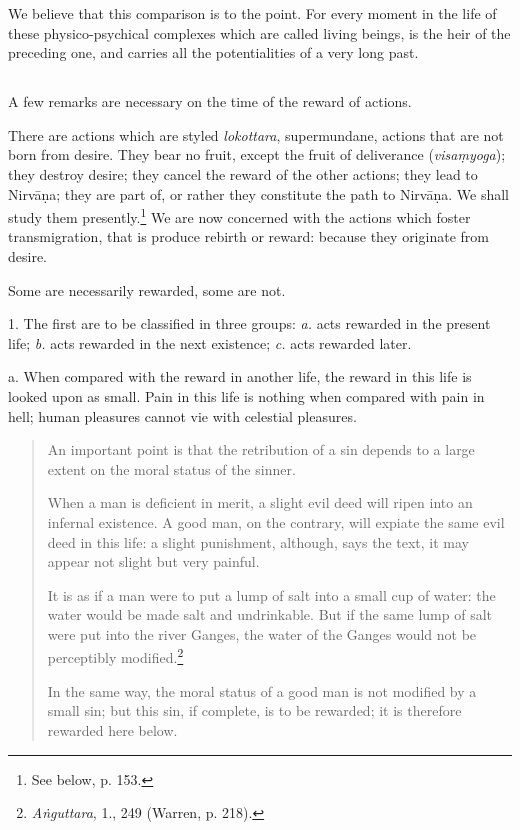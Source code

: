 \documentclass[a4paper, 11pt, oneside, english]{article}
\begin{document}
We believe that this comparison is to the point. For every moment in the life of these physico-psychical complexes which are called living beings, is the heir of the preceding one, and carries all the potentialities of a very long past.

\subsection{}
\paragraph{}
A few remarks are necessary on the time of the reward of actions.

There are actions which are styled \emph{lokottara}, supermundane, actions that are not born from desire. They bear no fruit, except the fruit of deliverance (\emph{visaṃyoga}); they destroy desire; they cancel the reward of the other actions; they lead to Nirvāṇa; they are part of, or rather they constitute the path to Nirvāṇa. We shall study them presently.\footnote{See below, p. 153.} We are now concerned with the actions which foster transmigration, that is produce rebirth or reward: because they originate from desire.

Some are necessarily rewarded, some are not.

1. The first are to be classified in three groups: \emph{a.} acts rewarded in the present life; \emph{b.} acts rewarded in the next existence; \emph{c.} acts rewarded later.

a. When compared with the reward in another life, the reward in this life is looked upon as small. Pain in this life is nothing when compared with pain in hell; human pleasures cannot vie with celestial pleasures.
\begin{quotation}
\small
An important point is that the retribution of a sin depends to a large extent on the moral status of the sinner.

When a man is deficient in merit, a slight evil deed will ripen into an infernal existence. A good man, on the contrary, will expiate the same evil deed in this life: a slight punishment, although, says the text, it may appear not slight but very painful.

It is as if a man were to put a lump of salt into a small cup of water: the water would be made salt and undrinkable. But if the same lump of salt were put into the river Ganges, the water of the Ganges would not be perceptibly modified.\footnote{\emph{Aṅguttara}, 1., 249 (Warren, p. 218).}

In the same way, the moral status of a good man is not modified by a small sin; but this sin, if complete, is to be rewarded; it is therefore rewarded here below.
\end{quotation}
\end{document}
